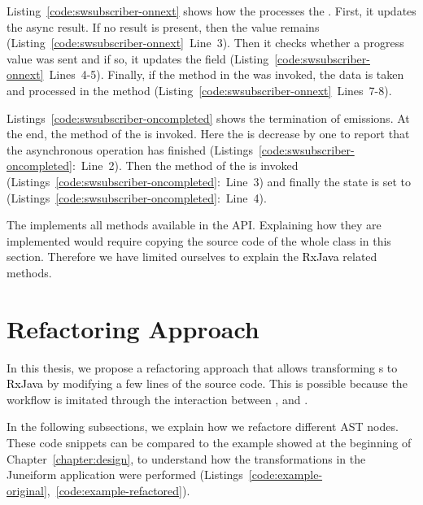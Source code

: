 \documentclass[type=bsc,accentcolor=tud9c]{tudthesis}
\newcommand{\framework}[1]{\textcolor{black}{#1}}
\begin{document}


Listing~\ref{code:swsubscriber-onnext} shows how the  processes the . First, it updates the async result. If no result is present, then the value remains  (Listing~\ref{code:swsubscriber-onnext}~Line~3). Then it checks whether a progress value was sent and if so, it updates the  field (Listing~\ref{code:swsubscriber-onnext}~Lines~4-5). Finally, if the  method in the  was invoked, the data is taken and processed in the  method (Listing~\ref{code:swsubscriber-onnext}~Lines~7-8).

Listings~\ref{code:swsubscriber-oncompleted} shows the termination of emissions. At the end, the  method of the  is invoked. Here the  is decrease by one to report that the asynchronous operation has finished (Listings~\ref{code:swsubscriber-oncompleted}:~Line~2). Then the  method of the  is invoked (Listings~\ref{code:swsubscriber-oncompleted}:~Line~3) and finally the state is set to  (Listings~\ref{code:swsubscriber-oncompleted}:~Line~4).



The  implements all methods available in the  API. Explaining how they are implemented would require copying the source code of the whole class in this section. Therefore we have limited ourselves to explain the \framework{RxJava} related methods.


\section{Refactoring Approach}
\label{sec:refactoring-approach}
In this thesis, we propose a refactoring approach that allows transforming s to \framework{RxJava} by modifying a few lines of the source code. This is possible because the  workflow is imitated through the interaction between ,  and .

In the following subsections, we explain how we refactore different AST nodes. These code snippets can be compared to the example showed at the beginning of Chapter~\ref{chapter:design}, to understand how the transformations in the Juneiform application were performed (Listings~\ref{code:example-original},~\ref{code:example-refactored}).
\end{document}
